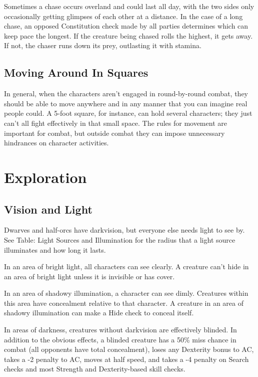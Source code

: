Sometimes a chase occurs overland and could last all day, with the two sides only 
occasionally getting glimpses of each other at a distance. In the case of a long 
chase, an opposed Constitution check made by all parties determines which can keep 
pace the longest. If the creature being chased rolls the highest, it gets away. 
If not, the chaser runs down its prey, outlasting it with stamina.

\subsection{Moving Around In Squares}

In general, when the characters aren't engaged in round-by-round combat, they should 
be able to move anywhere and in any manner that you can imagine real people could. 
A 5-foot square, for instance, can hold several characters; they just can't all 
fight effectively in that small space. The rules for movement are important for 
combat, but outside combat they can impose unnecessary hindrances on character 
activities.

\section{Exploration}

\subsection{Vision and Light}

Dwarves and half-orcs have darkvision, but everyone else needs light to see by. 
See Table: Light Sources and Illumination for the radius that a light source illuminates 
and how long it lasts.

In an area of bright light, all characters can see clearly. A creature can't hide 
in an area of bright light unless it is invisible or has cover.

In an area of shadowy illumination, a character can see dimly. Creatures within 
this area have concealment relative to that character. A creature in an area of 
shadowy illumination can make a Hide check to conceal itself.

In areas of darkness, creatures without darkvision are effectively blinded. In 
addition to the obvious effects, a blinded creature has a 50\% miss chance in combat 
(all opponents have total concealment), loses any Dexterity bonus to AC, takes 
a -2 penalty to AC, moves at half speed, and takes a -4 penalty on Search checks 
and most Strength and Dexterity-based skill checks.

